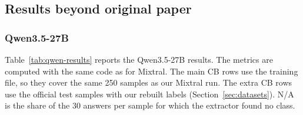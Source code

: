 \subsection{Results beyond original paper}

\subsubsection{Qwen3.5-27B}
\label{sec:results-qwen}

Table~\ref{tab:qwen-results} reports the Qwen3.5-27B results. The metrics are
computed with the same code as for Mixtral. The main CB rows use the training
file, so they cover the same 250 samples as our Mixtral run. The extra CB rows
use the official test samples with our rebuilt labels
(Section~\ref{sec:datasets}). N/A is the share of the 30 answers per sample
for which the extractor found no class.

